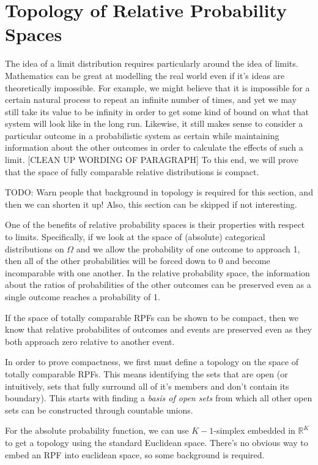 \documentclass[twoside]{article}
\theoremstyle{plain}%
\theoremstyle{definition}
\theoremstyle{remark}
\begin{document}
\section{Topology of Relative Probability Spaces}

The idea of a limit distribution requires particularly around the idea of limits. Mathematics can be great at modelling the real world even if it's ideas are theoretically impossible. For example, we might believe that it is impossible for a certain natural process to repeat an infinite number of times, and yet we may still take its value to be infinity in order to get some kind of bound on what that system will look like in the long run. Likewise, it still makes sense to consider a particular outcome in a probabilistic system as certain while maintaining information about the other outcomes in order to calculate the effects of such a limit. [CLEAN UP WORDING OF PARAGRAPH] To this end, we will prove that the space of fully comparable relative distributions is compact.

TODO: Warn people that background in topology is required for this section, and then we can shorten it up! Also, this section can be skipped if not interesting.

One of the benefits of relative probability spaces is their properties with respect to limits. Specifically, if we look at the space of (absolute) categorical distributions on \(\Omega\) and we allow the probability of one outcome to approach 1, then all of the other probabilities will be forced down to 0 and become incomparable with one another. In the relative probability space, the information about the ratios of probabilities of the other outcomes can be preserved even as a single outcome reaches a probability of 1.

If the space of totally comparable RPFs can be shown to be compact, then we know that relative probabilites of outcomes and events are preserved even as they both approach zero relative to another event.

In order to prove compactness, we first must define a topology on the space of totally comparable RPFs. This means identifying the sets that are open (or intuitively, sets that fully surround all of it's members and don't contain its boundary). This starts with finding a \textit{basis of open sets} from which all other open sets can be constructed through countable unions.

For the absolute probability function, we can use \(K-1\)-simplex embedded in \(\mathbb{R}^K\) to get a topology using the standard Euclidean space. There's no obvious way to embed an RPF into euclidean space, so some background is required.
\end{document}
